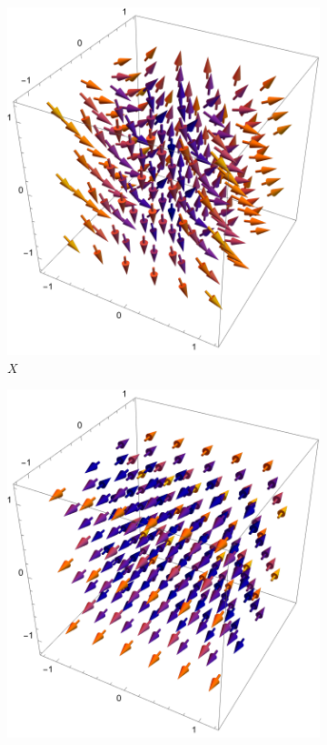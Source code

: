 \documentclass[spanish]{book}
\theoremstyle{definition}
\begin{document}
	\begin{figure}[H]
		\begin{subfigure}{0.5\linewidth}
			\centering
			\includegraphics[width=0.9\linewidth]{fig10}
			\caption*{$X$}
		\end{subfigure}
		\begin{subfigure}{0.5\linewidth}
			\centering
			\includegraphics[width=0.9\linewidth]{fig11}

\end{subfigure}
\end{figure}
\end{document}
